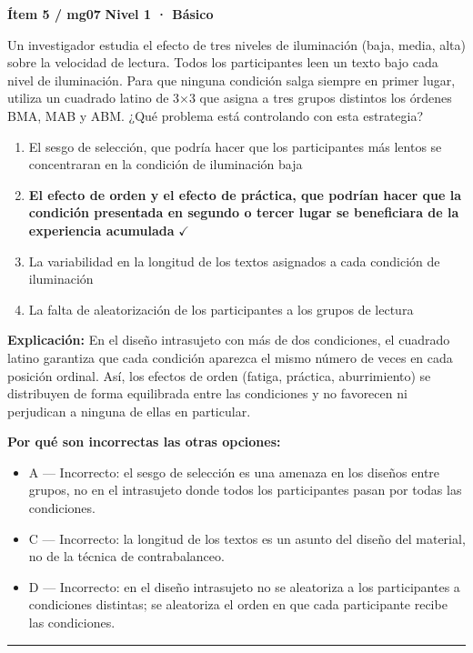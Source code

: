 \documentclass[12pt,a4paper]{article}
\begin{document}
\begin{mdframed}[backgroundcolor=fondogris,linecolor=azul,linewidth=1pt,innerleftmargin=10pt,innerrightmargin=10pt,innertopmargin=7pt,innerbottommargin=7pt]
\textbf{Ítem 5 / mg07} \hfill {\small\bfseries\color{azul} Nivel 1 · Básico}
\end{mdframed}

Un investigador estudia el efecto de tres niveles de iluminación (baja, media, alta) sobre la velocidad de lectura. Todos los participantes leen un texto bajo cada nivel de iluminación. Para que ninguna condición salga siempre en primer lugar, utiliza un cuadrado latino de 3×3 que asigna a tres grupos distintos los órdenes BMA, MAB y ABM. ¿Qué problema está controlando con esta estrategia?

\begin{enumerate}
  \item[A.] El sesgo de selección, que podría hacer que los participantes más lentos se concentraran en la condición de iluminación baja
  \item[\textbf{\color{verde}B.}] \textbf{\color{verde} El efecto de orden y el efecto de práctica, que podrían hacer que la condición presentada en segundo o tercer lugar se beneficiara de la experiencia acumulada} \hfill $\checkmark$
  \item[C.] La variabilidad en la longitud de los textos asignados a cada condición de iluminación
  \item[D.] La falta de aleatorización de los participantes a los grupos de lectura
\end{enumerate}

\noindent\textbf{\color{azul}Explicación:} En el diseño intrasujeto con más de dos condiciones, el cuadrado latino garantiza que cada condición aparezca el mismo número de veces en cada posición ordinal. Así, los efectos de orden (fatiga, práctica, aburrimiento) se distribuyen de forma equilibrada entre las condiciones y no favorecen ni perjudican a ninguna de ellas en particular.

\noindent\textbf{\color{gris}Por qué son incorrectas las otras opciones:}
\begin{itemize}
  \item {\small A — Incorrecto: el sesgo de selección es una amenaza en los diseños entre grupos, no en el intrasujeto donde todos los participantes pasan por todas las condiciones.}
  \item {\small C — Incorrecto: la longitud de los textos es un asunto del diseño del material, no de la técnica de contrabalanceo.}
  \item {\small D — Incorrecto: en el diseño intrasujeto no se aleatoriza a los participantes a condiciones distintas; se aleatoriza el orden en que cada participante recibe las condiciones.}
\end{itemize}
\vspace{8pt}\hrule\vspace{10pt}
\end{document}
